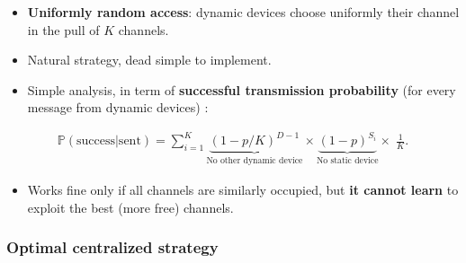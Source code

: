 \begin{frameO}

    \begin{itemize}
        \item
              \textbf{Uniformly random access}: dynamic devices choose uniformly
              their channel in the pull of \(K\) channels.
        \item
              Natural strategy, dead simple to implement.
    \end{itemize}

    \pause

    \begin{itemize}
        \item
              Simple analysis, in term of \textbf{successful transmission
                  probability} (for every message from dynamic devices) :
    \end{itemize}

    \begin{small} \begin{align*}
            \mathbb{P}(\text{success}|\text{sent}) = \sum_{i=1}^{K} \underbrace{(1 - p / K)^{D-1}}_{\text{No other dynamic device}} \times \underbrace{(1-p)^{S_i}}_{\text{No static device}} \times\; \frac{1}{K}.
        \end{align*} \end{small}

    \pause

    \begin{itemize}
        \item
              Works fine only if all channels are similarly occupied,\newline
              but \textbf{it cannot learn} to exploit the best (more free)
              channels.
    \end{itemize}

\end{frameO}



\subsubsection{Optimal centralized strategy}

